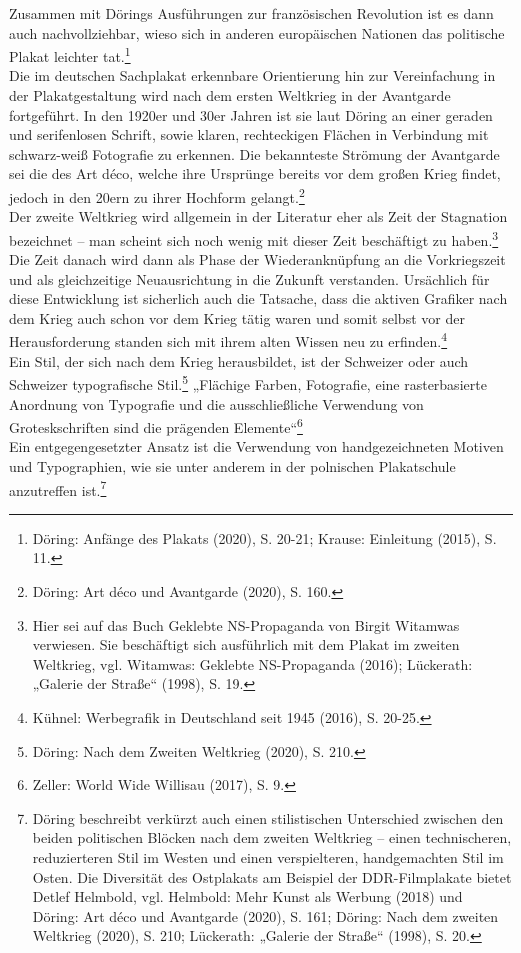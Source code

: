 \documentclass[a4paper,12pt,ngerman]{article}
\begin{document}
Zusammen mit Dörings Ausführungen zur französischen Revolution ist es dann auch nachvollziehbar, wieso sich in anderen europäischen Nationen das politische Plakat leichter tat.\footnote{Döring: Anfänge des Plakats (2020), S. 20-21; Krause: Einleitung (2015), S. 11.} \\
Die im deutschen Sachplakat erkennbare Orientierung hin zur Vereinfachung in der Plakatgestaltung wird nach dem ersten Weltkrieg in der Avantgarde fortgeführt. In den 1920er und 30er Jahren ist sie laut Döring an einer geraden und serifenlosen Schrift, sowie klaren, rechteckigen Flächen in Verbindung mit schwarz-weiß Fotografie zu erkennen. Die bekannteste Strömung der Avantgarde sei die des Art déco, welche ihre Ursprünge bereits vor dem großen Krieg findet, jedoch in den 20ern zu ihrer Hochform gelangt.\footnote{Döring: Art déco und Avantgarde (2020), S. 160.} \\
Der zweite Weltkrieg wird allgemein in der Literatur eher als Zeit der Stagnation bezeichnet – man scheint sich noch wenig mit dieser Zeit beschäftigt zu haben.\footnote{Hier sei auf das Buch Geklebte NS-Propaganda von Birgit Witamwas verwiesen. Sie beschäftigt sich ausführlich mit dem Plakat im zweiten Weltkrieg, vgl. Witamwas: Geklebte NS-Propaganda (2016); Lückerath: „Galerie der Straße“ (1998), S. 19.}  Die Zeit danach wird dann als Phase der Wiederanknüpfung an die Vorkriegszeit und als gleichzeitige Neuausrichtung in die Zukunft verstanden. Ursächlich für diese Entwicklung ist sicherlich auch die Tatsache, dass die aktiven Grafiker nach dem Krieg auch schon vor dem Krieg tätig waren und somit selbst vor der Herausforderung standen sich mit ihrem alten Wissen neu zu erfinden.\footnote{Kühnel: Werbegrafik in Deutschland seit 1945 (2016), S. 20-25.} \\
Ein Stil, der sich nach dem Krieg herausbildet, ist der Schweizer oder auch Schweizer typografische Stil.\footnote{Döring: Nach dem Zweiten Weltkrieg (2020), S. 210.}  „Flächige Farben, Fotografie, eine rasterbasierte Anordnung von Typografie und die ausschließliche Verwendung von Groteskschriften sind die prägenden Elemente“\footnote{Zeller: World Wide Willisau (2017), S. 9.} \\
Ein entgegengesetzter Ansatz ist die Verwendung von handgezeichneten Motiven und Typographien, wie sie unter anderem in der polnischen Plakatschule anzutreffen ist.\footnote{Döring beschreibt verkürzt auch einen stilistischen Unterschied zwischen den beiden politischen Blöcken nach dem zweiten Weltkrieg – einen technischeren, reduzierteren Stil im Westen und einen verspielteren, handgemachten Stil im Osten. Die Diversität des Ostplakats am Beispiel der DDR-Filmplakate bietet Detlef Helmbold, vgl. Helmbold: Mehr Kunst als Werbung (2018) und Döring: Art déco und Avantgarde (2020), S. 161; Döring: Nach dem zweiten Weltkrieg (2020), S. 210; Lückerath: „Galerie der Straße“ (1998), S. 20.} \\
\end{document}

